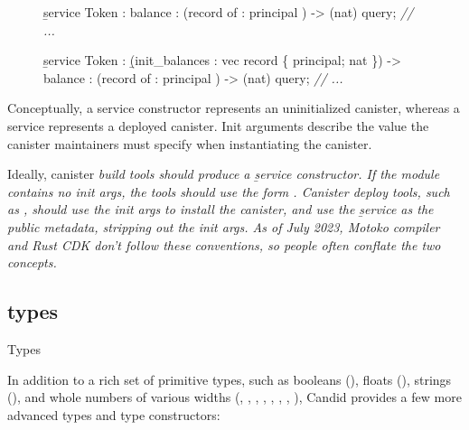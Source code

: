 \documentclass{article}
\begin{document}
\begin{figure}
\begin{code}[candid]
\b{service} Token : {
  balance : (record { of : principal }) -> (nat) query;
  \em{// ...}
}
\end{code}
\begin{code}[candid]
\b{service} Token : \b{(init_balances : vec record \{ principal; nat \})} -> {
  balance : (record { of : principal }) -> (nat) query;
  \em{// ...}
}
\end{code}
\end{figure}

Conceptually, a service constructor represents an uninitialized canister, whereas a service represents a deployed canister.
Init arguments describe the value the canister maintainers must specify when instantiating the canister.

Ideally, canister \em{build} tools should produce a \b{service constructor}.
If the module contains no init args, the tools should use the form .
Canister \em{deploy} tools, such as \href{https://internetcomputer.org/docs/current/references/cli-reference/dfx-deploy}{}, should use the init args to install the canister, and use the \b{service} as the public metadata, stripping out the init args.
As of July 2023, Motoko compiler and Rust CDK don't follow these conventions, so people often conflate the two concepts.

\subsection{types}{Types}

In addition to a rich set of primitive types, such as booleans (), floats (), strings (), and whole numbers of various widths (, , , , , , , ), Candid provides a few more advanced types and type constructors:
\end{document}
